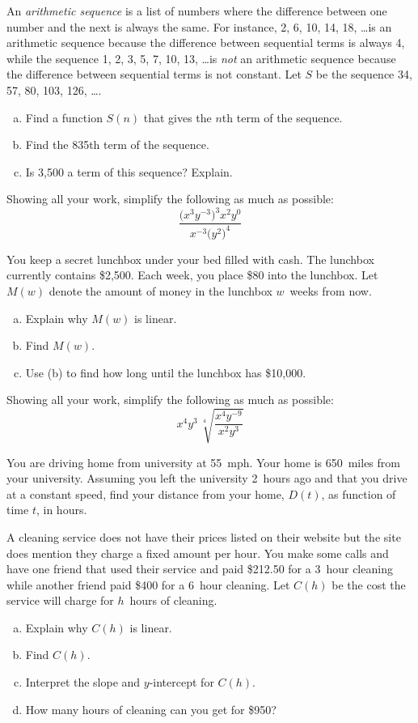 \documentclass[11pt,letterpaper]{article}
\begin{document}
\prob An \textit{arithmetic sequence} is a list of numbers where the difference between one number and the next is always the same. For instance, 2, 6, 10, 14, 18, \dots is an arithmetic sequence because the difference between sequential terms is always 4, while the sequence 1, 2, 3, 5, 7, 10, 13, \dots is \textit{not} an arithmetic sequence because the difference between sequential terms is not constant. Let $S$ be the sequence 34, 57, 80, 103, 126, \dots. 
	\begin{enumerate}[(a)]
	\item Find a function $S(n)$ that gives the $n$th term of the sequence. 
	\item Find the 835th term of the sequence. 
	\item Is 3,500 a term of this sequence? Explain. 
	\end{enumerate} \pspace


\prob Showing all your work, simplify the following as much as possible: 
	\[
	\dfrac{\big( x^3 y^{-3} \big)^3 x^2 y^0}{x^{-3} \big( y^2 \big)^4}
	\] \pspace


\prob You keep a secret lunchbox under your bed filled with cash. The lunchbox currently contains \$2,500. Each week, you place \$80 into the lunchbox. Let $M(w)$ denote the amount of money in the lunchbox $w$~weeks from now. 
	\begin{enumerate}[(a)]
	\item Explain why $M(w)$ is linear.
	\item Find $M(w)$. 
	\item Use (b) to find how long until the lunchbox has \$10,000. 
	\end{enumerate} \pspace


\prob Showing all your work, simplify the following as much as possible: 
	\[
	x^4 y^3 \, \sqrt[4]{\dfrac{x^4 y^{-9}}{x^2 y^3}}
	\]  \pspace


\prob You are driving home from university at 55~mph. Your home is 650~miles from your university. Assuming you left the university 2~hours ago and that you drive at a constant speed, find your distance from your home, $D(t)$, as function of time $t$, in hours. \pspace


\prob A cleaning service does not have their prices listed on their website but the site does mention they charge a fixed amount per hour. You make some calls and have one friend that used their service and paid \$212.50 for a 3~hour cleaning while another friend paid \$400 for a 6~hour cleaning. Let $C(h)$ be the cost the service will charge for $h$~hours of cleaning.
	\begin{enumerate}[(a)]
	\item Explain why $C(h)$ is linear.
	\item Find $C(h)$.
	\item Interpret the slope and $y$-intercept for $C(h)$.
	\item How many hours of cleaning can you get for \$950?
	\end{enumerate} \pspace
\end{document}
